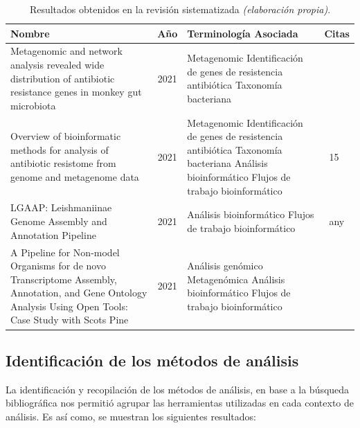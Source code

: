 \documentclass[12pt]{article}
\begin{document}
\begin{table}[htbp]
    \centering
    \caption{Resultados obtenidos en la revisión sistematizada \emph{(elaboración propia)}.}
    \label{tabla:resultados}
    \begin{tabularx}{\textwidth}{|>{\raggedright\arraybackslash}X|c|>{\raggedright\arraybackslash}X|>{\raggedright\arraybackslash}X|}
        \hline
        \textbf{Nombre} & \textbf{Año} & \textbf{Terminología Asociada} & \textbf{Citas} \\
        \hline
        Metagenomic and network analysis revealed wide distribution of antibiotic resistance genes in monkey gut microbiota
        & 2021 & Metagenomic \newline Identificación de genes de resistencia antibiótica \newline Taxonomía bacteriana & ~ \\
        \hline
        Overview of bioinformatic methods for analysis of antibiotic resistome from genome and metagenome data
        & 2021 & Metagenomic \newline Identificación de genes de resistencia antibiótica \newline Taxonomía bacteriana \newline Análisis bioinformático \newline Flujos de trabajo bioinformático & ~15 \\
        \hline
        LGAAP: Leishmaniinae Genome Assembly and Annotation Pipeline
        & 2021 & Análisis bioinformático \newline Flujos de trabajo bioinformático & ~any \\
        \hline
        A Pipeline for Non-model Organisms for de novo Transcriptome Assembly, Annotation, and Gene Ontology Analysis Using Open Tools: Case Study with Scots Pine
        & 2021 & Análisis genómico \newline Metagenómica \newline Análisis bioinformático \newline Flujos de trabajo bioinformático & ~ \\
        \hline
    \end{tabularx}
\end{table}

\subsection{Identificación de los métodos de análisis}

La identificación y recopilación de los métodos de análisis, 
en base a la búsqueda bibliográfica nos permitió agrupar las 
herramientas utilizadas en cada contexto de análisis. Es así como, 
se muestran los siguientes resultados:
\end{document}
